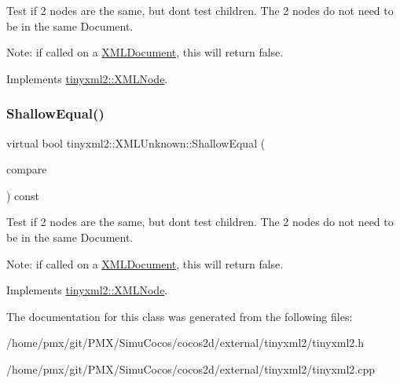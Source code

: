 Test if 2 nodes are the same, but don\textquotesingle{}t test children. The 2 nodes do not need to be in the same Document.

Note\+: if called on a \hyperlink{classtinyxml2_1_1XMLDocument}{X\+M\+L\+Document}, this will return false. 

Implements \hyperlink{classtinyxml2_1_1XMLNode_a7ce18b751c3ea09eac292dca264f9226}{tinyxml2\+::\+X\+M\+L\+Node}.

\mbox{\label{classtinyxml2_1_1XMLUnknown_a0715ab2c05d7f74845c188122213b116}} 
\subsubsection{\texorpdfstring{Shallow\+Equal()}{ShallowEqual()}\hspace{0.1cm}{\footnotesize\ttfamily [2/2]}}
{\footnotesize\ttfamily virtual bool tinyxml2\+::\+X\+M\+L\+Unknown\+::\+Shallow\+Equal (\begin{DoxyParamCaption}\item[{const \hyperlink{classtinyxml2_1_1XMLNode}{X\+M\+L\+Node} $\ast$}]{compare }\end{DoxyParamCaption}) const\hspace{0.3cm}{\ttfamily [virtual]}}

Test if 2 nodes are the same, but don\textquotesingle{}t test children. The 2 nodes do not need to be in the same Document.

Note\+: if called on a \hyperlink{classtinyxml2_1_1XMLDocument}{X\+M\+L\+Document}, this will return false. 

Implements \hyperlink{classtinyxml2_1_1XMLNode_a7ce18b751c3ea09eac292dca264f9226}{tinyxml2\+::\+X\+M\+L\+Node}.



The documentation for this class was generated from the following files\+:\begin{DoxyCompactItemize}
\item 
/home/pmx/git/\+P\+M\+X/\+Simu\+Cocos/cocos2d/external/tinyxml2/tinyxml2.\+h\item 
/home/pmx/git/\+P\+M\+X/\+Simu\+Cocos/cocos2d/external/tinyxml2/tinyxml2.\+cpp\end{DoxyCompactItemize}
